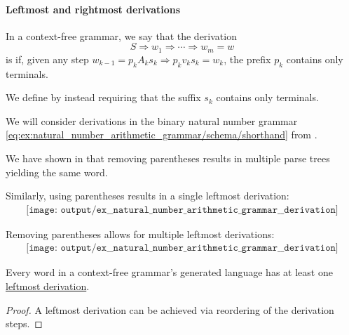 \paragraph{Leftmost and rightmost derivations}

\begin{definition}\label{def:leftmost_derivation}
  In a context-free grammar, we say that the derivation
  \begin{equation*}
    S \Rightarrow w_1 \Rightarrow \cdots \Rightarrow w_m = w
  \end{equation*}
  is  if, given any step \( w_{k-1} = p_k A_k s_k \Rightarrow p_k v_k s_k = w_k \), the prefix \( p_k \) contains only terminals.

  We define  by instead requiring that the suffix \( s_k \) contains only terminals.
\end{definition}

\begin{example}\label{ex:natural_number_arithmetic_grammar/derivation}
  We will consider derivations in the binary natural number grammar \eqref{eq:ex:natural_number_arithmetic_grammar/schema/shorthand} from .

  We have shown in  that removing parentheses results in multiple parse trees yielding the same word.

  Similarly, using parentheses results in a single leftmost derivation:
  \begin{equation*}
    \begin{aligned}
      \texttt{[image: output/ex\_\_natural\_number\_arithmetic\_grammar\_\_derivation]}
    \end{aligned}
  \end{equation*}

  Removing parentheses allows for multiple leftmost derivations:
  \begin{equation*}
    \begin{aligned}
      \texttt{[image: output/ex\_\_natural\_number\_arithmetic\_grammar\_\_derivation]}
    \end{aligned}
  \end{equation*}
\end{example}

\begin{proposition}\label{thm:leftmost_derivation_existence}
  Every word in a context-free grammar's generated language has at least one \hyperref[def:leftmost_derivation]{leftmost derivation}.
\end{proposition}
\begin{proof}
  A leftmost derivation can be achieved via reordering of the derivation steps.
\end{proof}

